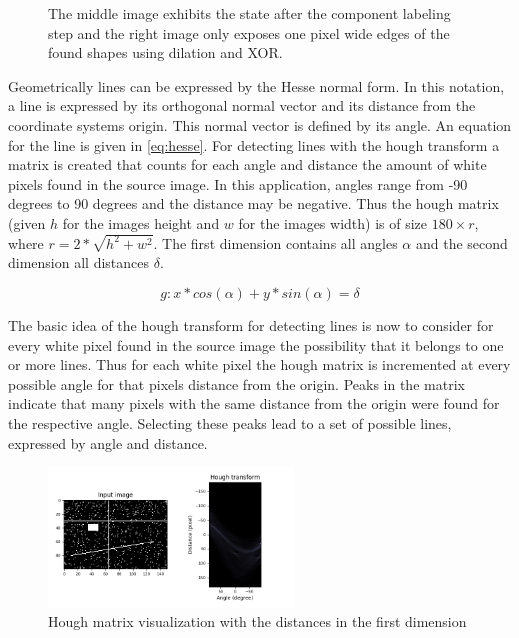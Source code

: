 \documentclass{report}
\begin{document}
\begin{figure}
\begin{subfigure}[t]{0.316\textwidth}
  \end{subfigure}
  \caption{The middle image exhibits the state after the component
    labeling step and the right image only exposes one pixel wide
    edges of the found shapes using dilation and XOR.}
  \label{img:dilation_xor}
\end{figure}

Geometrically lines can be expressed by the Hesse normal form. In this
notation, a line is expressed by its orthogonal normal vector and its
distance from the coordinate systems origin. This normal vector is
defined by its angle. An equation for the line is given in
\ref{eq:hesse}. For detecting lines with the hough transform a matrix
is created that counts for each angle and distance the amount of white
pixels found in the source image. In this application, angles range
from -90 degrees to 90 degrees and the distance may be negative. Thus
the hough matrix (given \( h \) for the images height and \( w \) for
the images width) is of size \( 180 \times r \), where \( r = 2 *
\sqrt{h^2 + w^2} \). The first dimension contains all angles \( \alpha
\) and the second dimension all distances \( \delta \).

\begin{equation}\label{eq:hesse}
  g: x * cos(\alpha) + y * sin(\alpha) = \delta
\end{equation}

The basic idea of the hough transform for detecting lines is now to
consider for every white pixel found in the source image the
possibility that it belongs to one or more lines. Thus for each white
pixel the hough matrix is incremented at every possible angle for that
pixels distance from the origin. Peaks in the matrix indicate that
many pixels with the same distance from the origin were found for the
respective angle. Selecting these peaks lead to a set of possible
lines, expressed by angle and distance.

\begin{figure}
  \begin{center}
    \includegraphics[width=0.58\textwidth]{src/hough_tf}
  \end{center}
  \caption[x]{Hough matrix visualization with the distances in the first
    dimension\footnotemark}
  \label{img:red_detection}
\end{figure}
\end{document}
